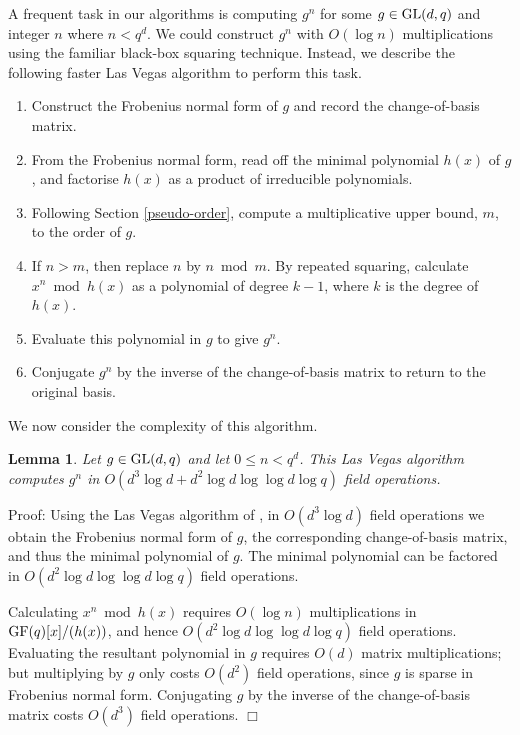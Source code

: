 \documentclass[12pt]{article}
\newtheorem{lemma}[definition]{Lemma}
\newenvironment{proof}{\normalsize {\sc Proof}:}{{\hfill $\Box$ \\}}
\def\GL{{\rm GL}}
\def\Oh{O}  %
\def\GF{{\rm GF}}
\begin{document}
A frequent task in our algorithms is computing 
$g^n$ for some $g\in \GL(d,q)$ and integer $n$
where $n< q^d$. We
could construct $g^n$ with $\Oh(\log n)$ multiplications using the familiar
black-box squaring technique. 
Instead, we describe the following faster Las Vegas
algorithm to perform this task.
\begin{enumerate}
\item 
Construct the Frobenius normal form of $g$ and record
the change-of-basis matrix. 

\item 
 From the Frobenius normal form, 
read off the minimal polynomial
$h(x)$ of $g$, and factorise $h(x)$ 
as a product of irreducible polynomials.

\item 
Following Section \ref{pseudo-order},
compute a multiplicative upper bound, $m$, to the order of $g$. 

\item If $n>m$, then replace $n$ by $n\bmod m$. 
By repeated squaring, calculate $x^n\bmod h(x)$ 
as a polynomial of degree $k-1$, where $k$ is the degree of $h(x)$.

\item Evaluate this polynomial in $g$ to give $g^n$. 

\item Conjugate $g^n$ by the inverse of the change-of-basis 
matrix to return to the original basis.
\end{enumerate}

We now consider the complexity of this algorithm.
\begin{lemma}\label{compute-power}
Let $g\in\GL(d,q)$ and let $0\le n<q^d$. This 
Las Vegas algorithm computes $g^n$ in 
$\Oh(d^3 \log d + d^2\log d \log\log d \log q)$ field operations.
\end{lemma}
\begin{proof}
Using the Las Vegas algorithm of \cite{Giesbrecht}, 
in $\Oh(d^3 \log d)$ field operations 
we obtain the Frobenius normal form of $g$, the corresponding 
change-of-basis matrix, and thus the minimal polynomial of $g$.
The minimal polynomial can be factored in 
$\Oh(d^2 \log d \log\log d\log q)$ field operations.

Calculating $x^n \bmod h(x)$ requires $\Oh(\log n)$
multiplications in $\GF(q)[x]/(h(x))$,  and hence 
$\Oh(d^2 \log d \log \log d \log q)$ 
field operations. %
Evaluating the resultant polynomial in $g$ requires
$\Oh(d)$ matrix multiplications;  but multiplying by 
$g$ only costs $\Oh(d^2)$ field operations, since $g$ is sparse 
in Frobenius normal form. Conjugating $g$ by the inverse of 
the change-of-basis matrix costs $\Oh(d^3)$ field operations.
\end{proof}
\end{document}
